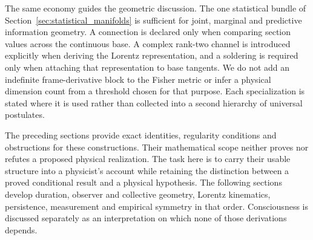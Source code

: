 The same economy guides the geometric discussion. The one statistical bundle of Section~\ref{sec:statistical_manifolds} is sufficient for joint, marginal and predictive information geometry. A connection is declared only when comparing section values across the continuous base. A complex rank-two channel is introduced explicitly when deriving the Lorentz representation, and a soldering is required only when attaching that representation to base tangents. We do not add an indefinite frame-derivative block to the Fisher metric or infer a physical dimension count from a threshold chosen for that purpose. Each specialization is stated where it is used rather than collected into a second hierarchy of universal postulates.

The preceding sections provide exact identities, regularity conditions and obstructions for these constructions. Their mathematical scope neither proves nor refutes a proposed physical realization. The task here is to carry their usable structure into a physicist's account while retaining the distinction between a proved conditional result and a physical hypothesis. The following sections develop duration, observer and collective geometry, Lorentz kinematics, persistence, measurement and empirical symmetry in that order. Consciousness is discussed separately as an interpretation on which none of those derivations depends.
